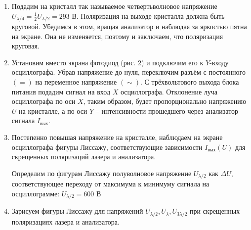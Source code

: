 \documentclass[a4paper,12pt]{article} %
\newcommand*\circled[1]{\tikz[baseline=(char.base)]{
		\node[shape=circle,draw,inner sep=2pt] (char) {#1};}}
\begin{document}
\begin{enumerate}
		\circled{$\parallel$} $\hspace*{20mm} \boxed{U_{\lambda / 2} = (585 \pm 15) \text{ В}} \hspace*{30mm}  \boxed{U_{\lambda} = (1140 \pm 15) \text{ В}}$
		
		
		\item Подадим на кристалл так называемое четвертьволновое напряжение $U_{\lambda / 4} = \frac{1}{2} U_{\lambda / 2} = 293$ В. Поляризация на выходе кристалла должна быть круговой. Убедимся в этом, вращая анализатор и наблюдая за яркостью пятна на экране. Она не изменяется, поэтому и заключаем, что поляризация круговая.
		
		\item Установим вместо экрана фотодиод (рис. 2) и подключим его к $Y$-входу осциллографа. Убрав напряжение до нуля, переключим разъём с постоянного $(=)$ на переменное напряжение $(\sim)$. С трёхвольтового выхода блока питания подадим сигнал на вход $X$ осциллографа. Отклонение луча осциллографа по оси $X$, таким образом, будет пропорционально напряжению $U$ на кристалле, а по оси $Y$ -- интенсивности прошедшего через анализатор сигнала $I_{\text{вых}}$.
		
		
		\item Постепенно повышая напряжение на кристалле, наблюдаем на экране осциллографа фигуры Лиссажу, соответствующие зависимости $I_{\text{вых}}(U)$ для скрещенных поляризаций лазера и анализатора.
		
		Определим по фигурам Лиссажу полуволновое напряжение $U_{\lambda / 2}$ как $\Delta U$, соответствующее переходу от максимума к минимуму сигнала на осциллограмме: $\boxed{U_{\lambda / 2} = 600 \text{ В} }$
		
		\item Зарисуем фигуры Лиссажу для напряжений $U_{\lambda / 2}, U_\lambda, U_{3\lambda / 2}$ при скрещенных поляризациях лазера и анализатора.


\end{enumerate}
\end{document}
